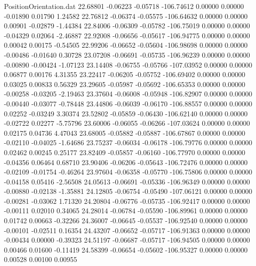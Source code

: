 \begin{filecontents}{PositionOrientation.dat}
  22.68801   -0.06223   -0.05718  -106.74612    0.00000    0.00000   -0.01890    0.01790    1.24582
  22.76812   -0.06374   -0.05575  -106.64632    0.00000    0.00000    0.00901   -0.02879   -1.44384
  22.84006   -0.06309   -0.05782  -106.75019    0.00000    0.00000   -0.04329    0.02064   -2.46887
  22.92008   -0.06656   -0.05617  -106.94775    0.00000    0.00000    0.00042    0.00175   -0.54505
  22.99206   -0.06652   -0.05604  -106.98698    0.00000    0.00000   -0.00486   -0.01640    0.30728
  23.07208   -0.06691   -0.05735  -106.96239    0.00000    0.00000   -0.00890   -0.00424   -1.07123
  23.14408   -0.06755   -0.05766  -107.03952    0.00000    0.00000    0.06877    0.00176    4.31355
  23.22417   -0.06205   -0.05752  -106.69402    0.00000    0.00000    0.03025    0.00833    0.56329
  23.29605   -0.05987   -0.05692  -106.65353    0.00000    0.00000   -0.00258   -0.03205   -2.19463
  23.37604   -0.06008   -0.05948  -106.82907    0.00000    0.00000   -0.00440   -0.03077   -0.78448
  23.44806   -0.06039   -0.06170  -106.88557    0.00000    0.00000    0.02252   -0.03249    3.30374
  23.52802   -0.05859   -0.06430  -106.62140    0.00000    0.00000   -0.02722    0.02277   -5.75796
  23.60006   -0.06055   -0.06266  -107.03624    0.00000    0.00000    0.02175    0.04736    4.47043
  23.68005   -0.05882   -0.05887  -106.67867    0.00000    0.00000   -0.02110   -0.04025   -1.64686
  23.75237   -0.06034   -0.06178  -106.79776    0.00000    0.00000    0.02462    0.00245    0.25177
  23.82409   -0.05857   -0.06160  -106.77970    0.00000    0.00000   -0.04356    0.06464    0.68710
  23.90406   -0.06206   -0.05643  -106.72476    0.00000    0.00000   -0.02109   -0.01754   -0.46264
  23.97604   -0.06358   -0.05770  -106.75806    0.00000    0.00000   -0.04158    0.05416   -2.56508
  24.05613   -0.06691   -0.05336  -106.96349    0.00000    0.00000   -0.00880   -0.02138   -1.35881
  24.12805   -0.06754   -0.05490  -107.06121    0.00000    0.00000   -0.00281   -0.03062    1.71320
  24.20804   -0.06776   -0.05735  -106.92417    0.00000    0.00000   -0.00111    0.02010    0.34065
  24.28014   -0.06784   -0.05590  -106.89961    0.00000    0.00000    0.01742    0.00663   -0.32266
  24.36007   -0.06645   -0.05537  -106.92540    0.00000    0.00000   -0.00101   -0.02511    0.16354
  24.43207   -0.06652   -0.05717  -106.91363    0.00000    0.00000   -0.00434    0.00000   -0.39323
  24.51197   -0.06687   -0.05717  -106.94505    0.00000    0.00000    0.00466    0.01600   -0.11419
  24.58399   -0.06654   -0.05602  -106.95327    0.00000    0.00000    0.00528    0.00100    0.00955

\end{filecontents}
